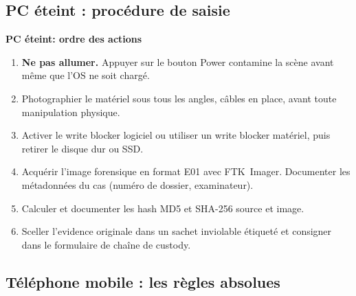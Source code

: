 \subsection{PC éteint : procédure de saisie}

\begin{boxPNC}
\textbf{PC éteint: ordre des actions}

\begin{enumerate}
    \item \textbf{Ne pas allumer.} Appuyer sur le bouton Power contamine
          la scène avant même que l'OS ne soit chargé.
    \item Photographier le matériel sous tous les angles, câbles en place,
          avant toute manipulation physique.
    \item Activer le write blocker logiciel ou utiliser un write blocker
          matériel, puis retirer le disque dur ou SSD.
    \item Acquérir l'image forensique en format E01 avec FTK~Imager.
          Documenter les métadonnées du cas (numéro de dossier, examinateur).
    \item Calculer et documenter les hash MD5 et SHA-256 source et image.
    \item Sceller l'evidence originale dans un sachet inviolable étiqueté
          et consigner dans le formulaire de chaîne de custody.
\end{enumerate}
\end{boxPNC}

\subsection{Téléphone mobile : les règles absolues}

